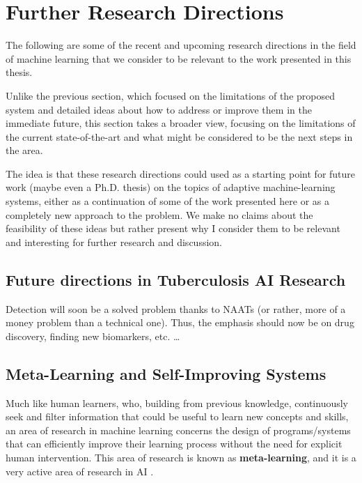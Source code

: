 \documentclass[../main.tex]{subfiles}
\begin{document}
    \clearpage

    \section{Further Research Directions} \label{conclusions:research_directions} 

    The following are some of the recent and upcoming research directions in the field of machine learning that we consider to be relevant to the work presented in this thesis.
    
    Unlike the previous section, which focused on the limitations of the proposed system and detailed ideas about how to address or improve them in the immediate future, this section takes a broader view, focusing on the limitations of the current state-of-the-art and what might be considered to be the next steps in the area.
    
    The idea is that these research directions could used as a starting point for future work (maybe even a Ph.D. thesis) on the topics of adaptive machine-learning systems, either as a continuation of some of the work presented here or as a completely new approach to the problem. We make no claims about the feasibility of these ideas but rather present why I consider them to be relevant and interesting for further research and discussion.


    \subsection{Future directions in Tuberculosis AI Research} \label{conclusions:future_work:tb_ai} 
    
    Detection will soon be a solved problem thanks to NAATs (or rather, more of a money problem than a technical one). Thus, the emphasis should now be on drug discovery, finding new biomarkers, etc. \dots

    \clearpage

    \subsection{Meta-Learning and Self-Improving Systems} \label{conclusions:research_directions:l2l} 

    Much like human learners, who, building from previous knowledge, continuously seek and filter information that could be useful to learn new concepts and skills, an area of research in machine learning concerns the design of programs/systems that can efficiently improve their learning process without the need for explicit human intervention. This area of research is known as \textbf{meta-learning}, and it is a very active area of research in AI .
    
\end{document}
